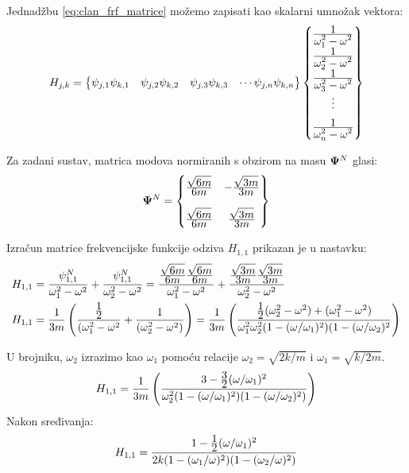 Jednadžbu \eqref{eq:clan_frf_matrice} možemo zapisati kao skalarni umnožak vektora:
\begin{equation}\label{eq:clan_frf_matrica_vektorski}
    H_{j,k}
    =
    \begin{Bmatrix}
        \psi_{j,1}\psi_{k,1} &
        \psi_{j,2}\psi_{k,2} &
        \psi_{j,3}\psi_{k,3} &
        \cdots
        \psi_{j,n}\psi_{k,n}
    \end{Bmatrix}
    \begin{Bmatrix}
        \frac{\displaystyle 1}{\displaystyle \omega_1^2-\omega^2}\\[6pt]
        \frac{\displaystyle 1}{\displaystyle \omega_2^2-\omega^2}\\[6pt]
        \frac{\displaystyle 1}{\displaystyle \omega_3^2-\omega^2}\\[6pt]
        \vdots\\[6pt]
        \frac{\displaystyle 1}{\displaystyle \omega_n^2-\omega^2}
    \end{Bmatrix}
\end{equation}

Za zadani sustav, matrica modova normiranih s obzirom na masu $\mathbf{\Psi}^N$ glasi:
\[
    \mathbf{\Psi}^N
    =
    \begin{Bmatrix}
        \frac{\displaystyle \sqrt{6m}}{\displaystyle 6m} & -\frac{\displaystyle \sqrt{3m}}{\displaystyle 3m}\\[12pt]
        \frac{\displaystyle \sqrt{6m}}{\displaystyle 6m} & \frac{\displaystyle \sqrt{3m}}{\displaystyle 3m}
    \end{Bmatrix}
\]

Izračun matrice frekvencijske funkcije odziva $H_{1,1}$ prikazan je u nastavku:
\[
\begin{aligned}
    H_{1,1} &=
    \frac{\psi^N_{1,1}}{\omega_1^2-\omega^2}+\frac{\psi^N_{1,1}}{\omega_2^2-\omega^2}
    =
    \frac{\frac{\displaystyle \sqrt{6m}}{\displaystyle 6m}\frac{\displaystyle \sqrt{6m}}{\displaystyle 6m}}{\omega_1^2-\omega^2}
    +
    \frac{\frac{\displaystyle \sqrt{3m}}{\displaystyle 3m}\frac{\displaystyle \sqrt{3m}}{\displaystyle 3m}}{\omega_2^2-\omega^2}\\
    H_{1,1} &=
    \frac{1}{3m} 
        \left(
            \frac{\frac{\displaystyle 1}{\displaystyle 2}}{(\omega_1^2-\omega^2}
            +
            \frac{1}{(\omega_2^2-\omega^2)}
        \right)
    =
    \frac{1}{3m}
        \left(
            \frac{\frac{\displaystyle 1}{\displaystyle 2}(\omega_2^2-\omega^2)+(\omega_1^2-\omega^2)}
                {\omega_1^2\omega_2^2(1-(\omega/\omega_1)^2)(1-(\omega/\omega_2)^2}
        \right)\\
\end{aligned}
\]

U brojniku, $\omega_2$ izrazimo kao $\omega_1$ pomoću relacije $\omega_2=\sqrt{2k/m}$
i $\omega_1=\sqrt{k/2m}$.
\[
    \begin{aligned}
        H_{1,1}=
        \frac{1}{3m}
            \left(
                \frac{3-\frac{\displaystyle 3}{\displaystyle 2}(\omega/\omega_1)^2}
                    {\omega_2^2(1-(\omega/\omega_1)^2)(1-(\omega/\omega_2)^2)}
            \right)
    \end{aligned}
\]
Nakon sređivanja:
\begin{equation}\label{eq:frf_11}
    H_{1,1}=\frac{1-\frac{\displaystyle 1}{\displaystyle 2}(\omega/\omega_1)^2}{2k(1-(\omega_1/\omega)^2)(1-(\omega_2/\omega)^2)}
\end{equation}

